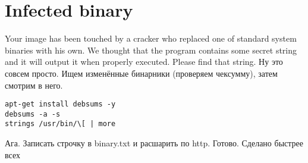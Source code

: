 \documentclass[a4paper,10pt]{report}
\begin{document}
\chapter{Infected binary}
Your image has been touched by a cracker who replaced one of standard system binaries with his own. We thought that the program contains some secret string and it will output it when properly executed. Please find that string.
\newline\newline
Ну это совсем просто. Ищем изменённые бинарники (проверяем чексумму), затем смотрим в него.
\newline
\begin{verbatim}
apt-get install debsums -y
debsums -a -s
strings /usr/bin/\[ | more
\end{verbatim}
Ага. Записать строчку в binary.txt и расшарить по http. Готово.
\newline\newline
Сделано быстрее всех %
\end{document}
